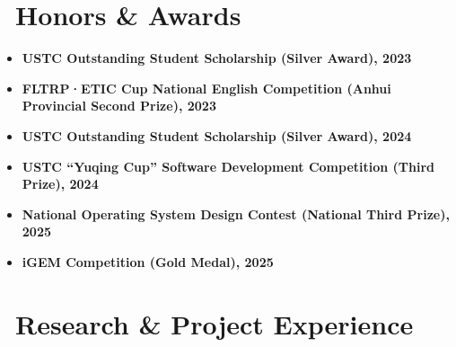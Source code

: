 \documentclass[11pt]{article}
\begin{document}
\vspace*{0.6em}

\section{\makebox[\widthof{\faGraduationCap}][c]{\color{CVBlue}\faTrophy}\ Honors \& Awards}
\begin{itemize}
    \item \textbf{USTC Outstanding Student Scholarship (Silver Award), 2023}
    \item \textbf{FLTRP·ETIC Cup National English Competition (Anhui Provincial Second Prize), 2023}
    \item \textbf{USTC Outstanding Student Scholarship (Silver Award), 2024}
    \item \textbf{USTC ``Yuqing Cup'' Software Development Competition (Third Prize), 2024}
    \item \textbf{National Operating System Design Contest (National Third Prize), 2025}
    \item \textbf{iGEM Competition (Gold Medal), 2025}
\end{itemize}

\vspace*{0.6em}

\section{\makebox[\widthof{\faGraduationCap}][c]{\color{CVBlue}\faUniversity}\ Research \& Project Experience}

\vspace*{0.2em}
\end{document}
